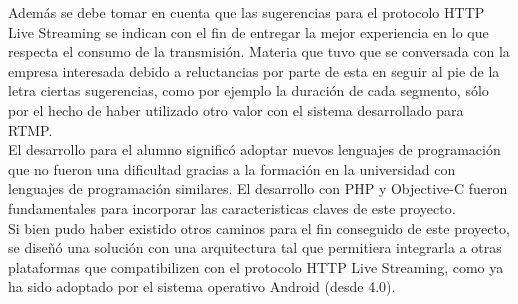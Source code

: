 Además se debe tomar en cuenta que las sugerencias para el protocolo HTTP Live Streaming se indican con el fin de entregar la mejor experiencia en lo que respecta el consumo de la transmisión. Materia que tuvo que se conversada con la empresa interesada debido a reluctancias por parte de esta en seguir al pie de la letra ciertas sugerencias, como por ejemplo la duración de cada segmento, sólo por el hecho de haber utilizado otro valor con el sistema desarrollado para RTMP.\\

El desarrollo para el alumno significó adoptar nuevos lenguajes de programación que no fueron una dificultad gracias a la formación en la universidad con lenguajes de programación similares. El desarrollo con PHP y Objective-C fueron fundamentales para incorporar las caracteristicas claves de este proyecto.\\

Si bien pudo haber existido otros caminos para el fin conseguido de este proyecto, se diseñó una solución con una arquitectura tal que permitiera integrarla a otras plataformas que compatibilizen con el protocolo HTTP Live Streaming, como ya ha sido adoptado por el sistema operativo Android (desde 4.0). \\



	
		
	

